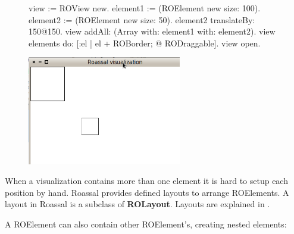 \documentclass[a4paper,10pt,twoside]{book}
\begin{document}
\begin{figure}[H]
      \begin{minipage}[t]{0.5\textwidth}
      \vspace{0pt}
\begin{code}{}
view := ROView new.
element1 := (ROElement new size: 100).
element2 := (ROElement new size: 50).
element2 translateBy: 150@150.
view addAll: (Array with: element1 with: element2).
view elements do: [:el | el + ROBorder; @ RODraggable].
view open.
\end{code}
   \end{minipage}
   \hfill
   \begin{minipage}[t]{0.6\textwidth}
      \vspace{0pt} \raggedright
       \centering
		\includegraphics[width=0.6\textwidth]{ex4}
   \end{minipage}
\label{fig:ex4}
\end{figure}


When a visualization contains more than one element it is hard to setup each position by hand. Roassal provides defined layouts to arrange ROElements. A layout in Roassal is a subclass of \textbf{ROLayout}. Layouts are explained in  .

A ROElement can also contain other ROElement's, creating nested elements:
\end{document}
